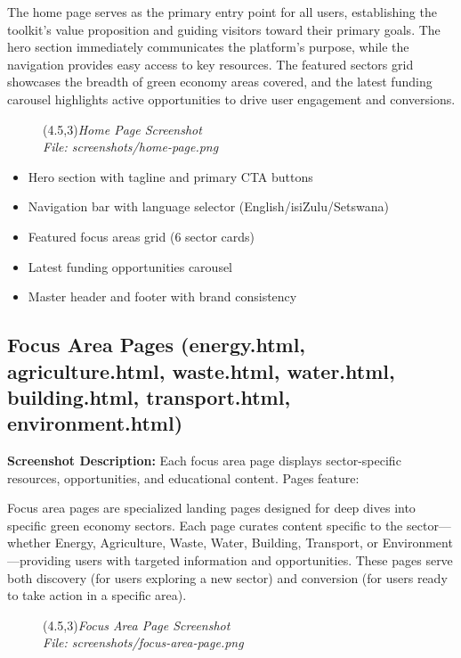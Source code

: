 \documentclass[a4paper,12pt]{article}
\begin{document}
The home page serves as the primary entry point for all users, establishing the toolkit's value proposition and guiding visitors toward their primary goals. The hero section immediately communicates the platform's purpose, while the navigation provides easy access to key resources. The featured sectors grid showcases the breadth of green economy areas covered, and the latest funding carousel highlights active opportunities to drive user engagement and conversions.

\begin{figure}[h]
    \centering
    \framebox(4.5,3){\textit{Home Page Screenshot}}\\
    \small\textit{File: screenshots/home-page.png}
\end{figure}

\begin{itemize}
    \item Hero section with tagline and primary CTA buttons
    \item Navigation bar with language selector (English/isiZulu/Setswana)
    \item Featured focus areas grid (6 sector cards)
    \item Latest funding opportunities carousel
    \item Master header and footer with brand consistency
\end{itemize}

\subsection{Focus Area Pages (energy.html, agriculture.html, waste.html, water.html, building.html, transport.html, environment.html)}
\textbf{Screenshot Description:} Each focus area page displays sector-specific resources, opportunities, and educational content. Pages feature:

Focus area pages are specialized landing pages designed for deep dives into specific green economy sectors. Each page curates content specific to the sector—whether Energy, Agriculture, Waste, Water, Building, Transport, or Environment—providing users with targeted information and opportunities. These pages serve both discovery (for users exploring a new sector) and conversion (for users ready to take action in a specific area).

\begin{figure}[h]
    \centering
    \framebox(4.5,3){\textit{Focus Area Page Screenshot}}\\
    \small\textit{File: screenshots/focus-area-page.png}
\end{figure}
\end{document}
